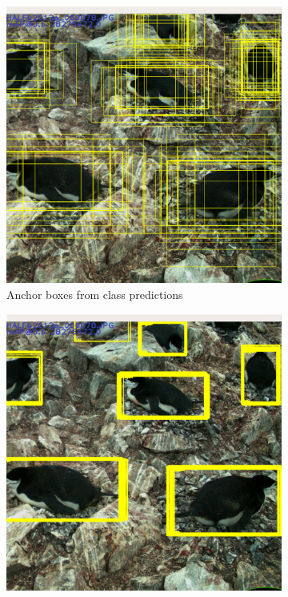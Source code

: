 \begin{figure}
  \centering
  \begin{subfigure}[t]{0.30\textwidth}
  \includegraphics[width=0.95\linewidth]{figures/object/anchors.png}
  \caption{Anchor boxes from class predictions}
  \end{subfigure}%
  \begin{subfigure}[t]{0.30\textwidth}
  \includegraphics[width=0.95\linewidth]{figures/object/predictions.png}

\end{subfigure}
\end{figure}
